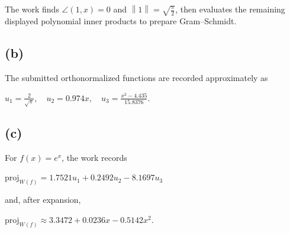 The work finds \(\angle\left( {1,x} \right) = 0\) and \(\left\| 1 \right\| = \sqrt{\frac{\pi}{2}}\), then evaluates the remaining displayed polynomial inner products to prepare Gram--Schmidt.

\subsection{(b)}

The submitted orthonormalized functions are recorded approximately as

\(u_{1} = \frac{2}{\sqrt{\pi}},\quad u_{2} = 0.974x,\quad u_{3} = \frac{x^{2} - 4.435}{15.8376}.\)

\subsection{(c)}

For \(f(x) = e^{x}\), the work records

\(\text{proj}_{W{(f)}} = 1.7521u_{1} + 0.2492u_{2} - 8.1697u_{3}\)

and, after expansion,

\(\text{proj}_{W{(f)}} \approx 3.3472 + 0.0236x - 0.5142x^{2}.\)
